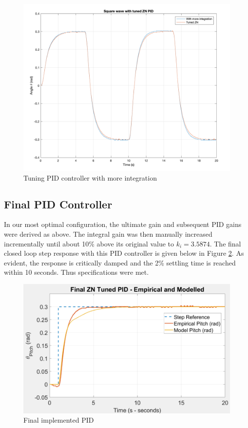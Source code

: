 \documentclass[11pt]{article}
\begin{document}
\begin{figure}[ht!]
    \centering
    \includegraphics[scale=0.5]{W2ZNSquare.png}
    \caption{Tuning PID controller with more integration}
    \label{fig:W2ZNSquare}
\end{figure}

\newpage
\subsection{Final PID Controller}
In our most optimal configuration, the ultimate gain and subsequent PID gains were derived as above. The integral gain was then manually increased incrementally until about 10\% above its original value to $k_i = 3.5874$. The final closed loop step response with this PID controller is given below in Figure \ref{fig:W2FinalPID}. As evident, the response is critically damped and the 2\% settling time is reached within 10 seconds. Thus specifications were met.
\begin{figure}[ht!]
    \centering
    \includegraphics[scale=0.4]{WS2_Final_ZN_B.PNG} %
    \caption{Final implemented PID}
    \label{fig:W2FinalPID}
\end{figure}
\end{document}
